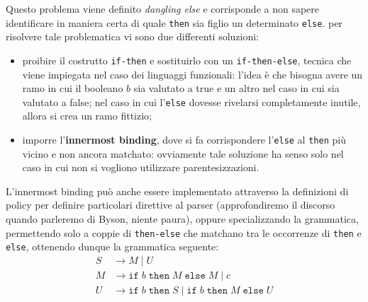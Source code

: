 \documentclass[class=book, crop=false, oneside, 12pt]{standalone}
\begin{document}
Questo problema viene definito \emph{dangling else} e corrisponde a non sapere identificare in maniera certa di quale \texttt{then} sia figlio un determinato \texttt{else}. per risolvere tale problematica vi sono due differenti soluzioni:
\begin{itemize}
    \item proibire il costrutto \texttt{if-then} e sostituirlo con un \texttt{if-then-else}, tecnica che viene impiegata nel caso dei linguaggi funzionali: l'idea è che bisogna avere un ramo in cui il booleano \(b\) sia valutato a true e un altro nel caso in cui sia valutato a false; nel caso in cui l'\texttt{else} dovesse rivelarsi completamente inutile, allora si crea un ramo fittizio;
    \item imporre l'\textbf{innermost binding}, dove si fa corrispondere l'\texttt{else} al \texttt{then} più vicino e non ancora matchato: ovviamente tale soluzione ha senso solo nel caso in cui non si vogliono utilizzare parentesizzazioni.
\end{itemize}
L'innermost binding può anche essere implementato attraverso la definizioni di policy per definire particolari direttive al parser (approfondiremo il discorso quando parleremo di Byson, niente paura), oppure specializzando la grammatica, permettendo solo a coppie di \texttt{then-else} che matchano tra le occorrenze di \texttt{then} e \texttt{else}, ottenendo dunque la grammatica seguente:
\begin{align*}
    S &\rightarrow M \mid U \\
    M &\rightarrow \texttt{if} \; b \; \texttt{then} \; M \; \texttt{else} \; M \mid c \\
    U &\rightarrow \texttt{if} \; b \; \texttt{then} \; S \mid \texttt{if} \; b \; \texttt{then} \; M \; \texttt{else} \; U
\end{align*}
\end{document}
